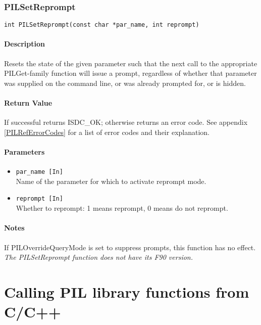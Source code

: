 \subsubsection{PILSetReprompt}\label{PILSetReprompt}

\begin{verbatim}
int PILSetReprompt(const char *par_name, int reprompt)
\end{verbatim}

\paragraph{Description\\}
Resets the state of the given parameter such that the next call
to the appropriate PILGet-family function will issue a prompt, regardless of
whether that parameter was supplied on the command line, or was already prompted
for, or is hidden.

\paragraph{Return Value\\}
If successful returns ISDC\_OK; otherwise returns an error code. See appendix \ref{PILRefErrorCodes}
for a list of error codes and their explanation.

\paragraph{Parameters}
\begin{itemize}
\item
{\tt par\_name [In] } \\
Name of the parameter for which to activate reprompt mode.
\item
{\tt reprompt [In] } \\
Whether to reprompt: 1 means reprompt, 0 means do not reprompt.
\end{itemize}

\paragraph{Notes\\}
{ If PILOverrideQueryMode is set to suppress prompts, this function has no effect.
\it
The PILSetReprompt function does not have its F90 version.
}



\section{Calling PIL library functions from C/C++}\label{PILRefCcalling}

